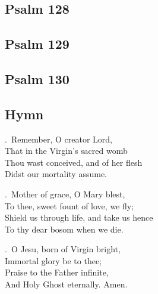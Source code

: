 \documentclass[12pt,a5paper]{memoir}
\begin{document}
\subsection*{Psalm 128}


\begin{Parallel}[v]{0.47\textwidth}{0.47\textwidth}

\end{Parallel}

\subsection*{Psalm 129}


\begin{Parallel}[v]{0.47\textwidth}{0.47\textwidth}

\end{Parallel}


\subsection*{Psalm 130}


\begin{Parallel}[v]{0.47\textwidth}{0.47\textwidth}

\end{Parallel}



\subsection{Hymn}


\begin{multicols}{2}

.\ Remember, O creator Lord,\\
That in the Virgin's sacred womb\\
Thou wast conceived, and of her flesh\\
Didst our mortality assume.

\smallskip 

.\ Mother of grace, O Mary blest,\\
To thee, sweet fount of love, we fly;\\
Shield us through life, and take us hence\\
To thy dear bosom when we die.

\smallskip

.\ O Jesu, born of Virgin bright,\\
Immortal glory be to thee;\\
Praise to the Father infinite,\\
And Holy Ghost eternally. Amen.

\end{multicols}
\end{document}
